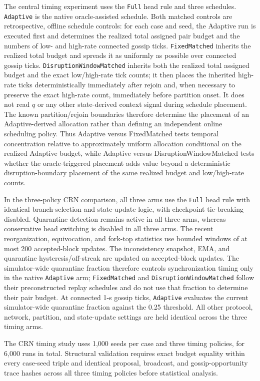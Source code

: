 \documentclass[11pt]{article}
\begin{document}
The central timing experiment uses the \texttt{Full} head rule and three schedules. \texttt{Adaptive} is the native oracle-assisted schedule. Both matched controls are retrospective, offline schedule controls: for each case and seed, the Adaptive run is executed first and determines the realized total assigned pair budget and the numbers of low- and high-rate connected gossip ticks. \texttt{FixedMatched} inherits the realized total budget and spreads it as uniformly as possible over connected gossip ticks. \texttt{DisruptionWindowMatched} inherits both the realized total assigned budget and the exact low/high-rate tick counts; it then places the inherited high-rate ticks deterministically immediately after rejoin and, when necessary to preserve the exact high-rate count, immediately before partition onset. It does not read $q$ or any other state-derived context signal during schedule placement. The known partition/rejoin boundaries therefore determine the placement of an Adaptive-derived allocation rather than defining an independent online scheduling policy. Thus Adaptive versus FixedMatched tests temporal concentration relative to approximately uniform allocation conditional on the realized Adaptive budget, while Adaptive versus DisruptionWindowMatched tests whether the oracle-triggered placement adds value beyond a deterministic disruption-boundary placement of the same realized budget and low/high-rate counts.

In the three-policy CRN comparison, all three arms use the \texttt{Full} head rule with identical branch-selection and state-update logic, with checkpoint tie-breaking disabled. Quarantine detection remains active in all three arms, whereas conservative head switching is disabled in all three arms. The recent reorganization, equivocation, and fork-top statistics use bounded windows of at most 200 accepted-block updates. The inconsistency snapshot, EMA, and quarantine hysteresis/off-streak are updated on accepted-block updates. The simulator-wide quarantine fraction therefore controls synchronization timing only in the native \texttt{Adaptive} arm; \texttt{FixedMatched} and \texttt{DisruptionWindowMatched} follow their preconstructed replay schedules and do not use that fraction to determine their pair budget. At connected 1-s gossip ticks, \texttt{Adaptive} evaluates the current simulator-wide quarantine fraction against the 0.25 threshold. All other protocol, network, partition, and state-update settings are held identical across the three timing arms.

The CRN timing study uses 1,000 seeds per case and three timing policies, for 6,000 runs in total. Structural validation requires exact budget equality within every case-seed triple and identical proposal, broadcast, and gossip-opportunity trace hashes across all three timing policies before statistical analysis.
\end{document}
